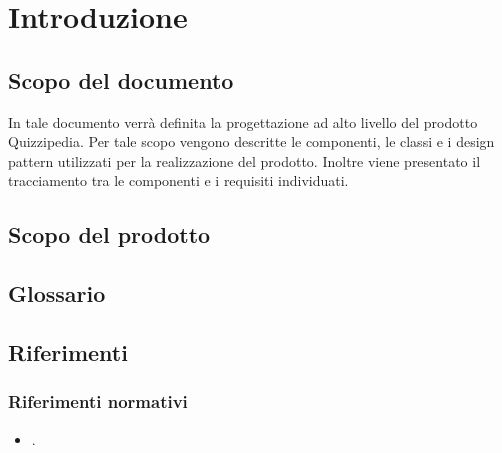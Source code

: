 \documentclass[a4paper, titlepage]{article}
\begin{document}
\pagestyle{fancy}	

\maketitle

\begin{diario}
\end{diario}

\newpage
\tableofcontents

\newpage
\listoffigures \label{lastromanpage}

\newpage
\clearpage	
{}
\hypersetup{linkcolor=blue}

\section{Introduzione}
\subsection{Scopo del documento}
In tale documento verrà definita la progettazione ad alto livello del prodotto Quizzipedia.
Per tale scopo vengono descritte le componenti, le classi e i design pattern utilizzati per la realizzazione del prodotto. Inoltre viene presentato il tracciamento tra le componenti e i requisiti individuati.

\subsection{Scopo del prodotto}
\SCOPO

\subsection{Glossario}
\GLOSSARIO

\subsection{Riferimenti}
\subsubsection{Riferimenti normativi}
\begin{itemize}
\item {} \NdPdoc.
\end{itemize}
\end{document}
